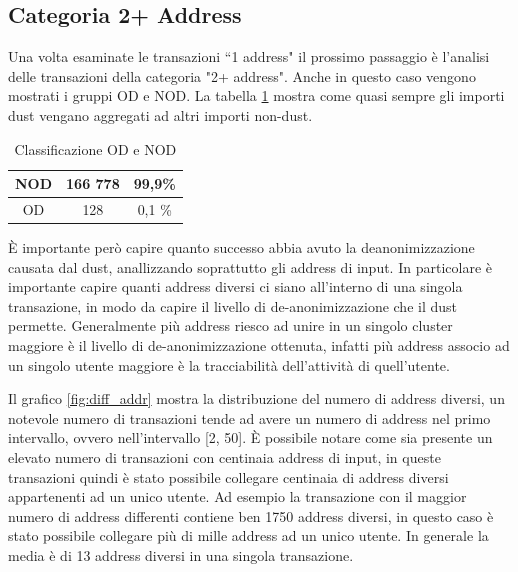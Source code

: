 \subsection{Categoria 2+ Address}
Una volta esaminate le transazioni ``1 address" il prossimo passaggio è l'analisi delle transazioni della categoria "2+ address". Anche in questo caso vengono mostrati i gruppi OD e NOD. La tabella \ref{tab:OD_NOD_success} mostra come quasi sempre gli importi dust vengano aggregati ad altri importi non-dust.
\begin{table}[H]
    \centering
    \begin{tabular}{|c|c|c|}
        \hline
            NOD  & 166 778 & 99,9\%\\
        \hline 
            OD  & 128 & 0,1 \%\\
        \hline
    \end{tabular}
    \caption{Classificazione OD e NOD}
    \label{tab:OD_NOD_success}
\end{table}
È importante però capire quanto successo abbia avuto la deanonimizzazione causata dal dust, anallizzando soprattutto gli address di input. In particolare è importante capire quanti address diversi ci siano all'interno di una singola transazione, in modo da capire il livello di de-anonimizzazione che il dust permette. Generalmente più address riesco ad unire in un singolo cluster maggiore è il livello di de-anonimizzazione ottenuta, infatti più address associo ad un singolo utente maggiore è la tracciabilità dell'attività di quell'utente.

Il grafico \ref{fig:diff_addr} mostra la distribuzione del numero di address diversi, un notevole numero di transazioni tende ad avere un numero di address nel primo intervallo, ovvero nell'intervallo [2, 50]. È possibile notare come sia presente un elevato numero di transazioni con centinaia address di input, in queste transazioni quindi è stato possibile collegare centinaia di address diversi appartenenti ad un unico utente. Ad esempio la transazione con il maggior numero di address differenti contiene ben 1750 address diversi, in questo caso è stato possibile collegare più di mille address ad un unico utente. In generale la media è di 13 address diversi in una singola transazione. 

